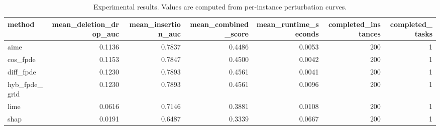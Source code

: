 \begin{table}[t]
\caption{Experimental results. Values are computed from per-instance perturbation curves.}
\label{tab:main_results_computed}
\centering
\begin{tabular}{lrrrrrr}
\toprule
method & mean\_deletion\_drop\_auc & mean\_insertion\_auc & mean\_combined\_score & mean\_runtime\_seconds & completed\_instances & completed\_tasks \\
\midrule
aime & 0.1136 & 0.7837 & 0.4486 & 0.0053 & 200 & 1 \\
cos\_fpde & 0.1153 & 0.7847 & 0.4500 & 0.0042 & 200 & 1 \\
diff\_fpde & 0.1230 & 0.7893 & 0.4561 & 0.0041 & 200 & 1 \\
hyb\_fpde\_grid & 0.1230 & 0.7893 & 0.4561 & 0.0096 & 200 & 1 \\
lime & 0.0616 & 0.7146 & 0.3881 & 0.0108 & 200 & 1 \\
shap & 0.0191 & 0.6487 & 0.3339 & 0.0667 & 200 & 1 \\
\bottomrule
\end{tabular}

\end{table}
